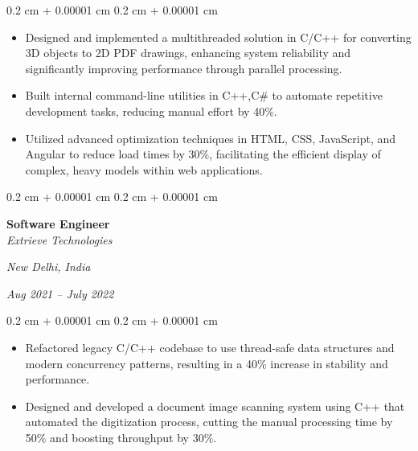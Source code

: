 \documentclass[10pt, letterpaper]{article}
\newenvironment{highlights}{
    \begin{itemize}[
        topsep=0.10 cm,
        parsep=0.10 cm,
        partopsep=0pt,
        itemsep=0pt,
        leftmargin=0.4 cm + 10pt
    ]
}{
    \end{itemize}
} %
\newenvironment{onecolentry}{
    \begin{adjustwidth}{
        0.2 cm + 0.00001 cm
    }{
        0.2 cm + 0.00001 cm
    }
}{
    \end{adjustwidth}
} %
\newenvironment{twocolentry}[2][]{
    \onecolentry
    \def\secondColumn{#2}
    \setcolumnwidth{\fill, 4.5 cm}
    \begin{paracol}{2}
}{
    \switchcolumn \raggedleft \secondColumn
    \end{paracol}
    \endonecolentry
} %
\begin{document}
    \vspace{0.10 cm}
        \begin{onecolentry}
            \begin{highlights}
                \item Designed and implemented a multithreaded solution in C/C++ for converting 3D objects to 2D PDF drawings, enhancing system reliability and significantly improving performance through parallel processing.
                \item Built internal command-line utilities in C++,C\# to automate repetitive development tasks, reducing manual effort by 40\%.
                \item Utilized advanced optimization techniques in HTML, CSS, JavaScript, and Angular to reduce load times by 30\%, facilitating the efficient display of complex, heavy models within web applications.
            \end{highlights}
        \end{onecolentry}

        \begin{twocolentry}{
        \textit{New Delhi, India}    
            
        \textit{Aug 2021 – July 2022}}
            \textbf{Software Engineer} \\
            \textit{Extrieve Technologies}
        \end{twocolentry}

        \vspace{0.10 cm}
        \begin{onecolentry}
            \begin{highlights}
               \item Refactored legacy C/C++ codebase to use thread-safe data structures and modern concurrency patterns, resulting in a 40\% increase in stability and performance.
                \item Designed and developed a document image scanning system using C++ that automated the digitization process, cutting the manual processing time by 50\% and boosting throughput by 30\%.
            \end{highlights}
        \end{onecolentry}
\end{document}
